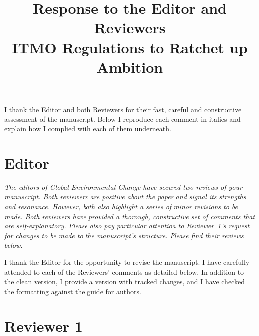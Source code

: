 \documentclass[11pt]{article}
\title{Response to the Editor and Reviewers\\[0.5em]
\large ITMO Regulations to Ratchet up Ambition}
\author{}
\date{}
\newenvironment{italic}{\itshape}{\par}
\begin{document}
\maketitle

\noindent I thank the Editor and both Reviewers for their fast, careful and constructive assessment of the manuscript. Below I reproduce each comment in italics and explain how I complied with each of them underneath.

\bigskip

\section*{Editor}

\begin{italic}
The editors of \emph{Global Environmental Change} have secured two reviews of your manuscript. Both reviewers are positive about the paper and signal its strengths and resonance. However, both also highlight a series of minor revisions to be made. Both reviewers have provided a thorough, constructive set of comments that are self-explanatory. Please also pay particular attention to Reviewer~1's request for changes to be made to the manuscript's structure. Please find their reviews below.


\end{italic}



I thank the Editor for the opportunity to revise the manuscript. I have carefully attended to each of the Reviewers' comments as detailed below. In addition to the clean version, I provide a version with tracked changes, and I have checked the formatting against the guide for authors.


\section*{Reviewer 1}
\end{document}
